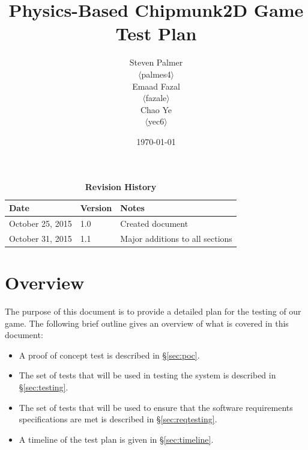 \documentclass[12pt, titlepage]{article}
\begin{document}
\title{\bf Physics-Based Chipmunk2D Game\\[\baselineskip]\Large Test Plan}
\author{Steven Palmer\\$\langle$palmes4$\rangle$\\Emaad Fazal\\$\langle$fazale$\rangle$\\Chao Ye\\$\langle$yec6$\rangle$}
\date{\today}
	
\maketitle

\tableofcontents
\listoftables
\listoffigures


\begin{table}[bp]
\caption*{\bf Revision History}
\begin{tabularx}{\textwidth}{p{3.5cm}p{2cm}X}
\toprule {\bf Date} & {\bf Version} & {\bf Notes}\\
\midrule
October 25, 2015 & 1.0 & Created document\\
October 31, 2015 & 1.1 & Major additions to all sections\\
\bottomrule
\end{tabularx}
\end{table}

\newpage


\section{Overview}
The purpose of this document is to provide a detailed plan for the testing of our game.  The following brief outline gives an overview of what is covered in this document:

\begin{itemize}
  \item A proof of concept test is described in \hyperref[sec:poc]{\S\ref*{sec:poc}}.
  \item The set of tests that will be used in testing the system is described in \hyperref[sec:testing]{\S\ref*{sec:testing}}.
  \item The set of tests that will be used to ensure that the software requirements specifications are met is described in \hyperref[sec:reqtesting]{\S\ref*{sec:reqtesting}}.
  \item A timeline of the test plan is given in \hyperref[sec:timeline]{\S\ref*{sec:timeline}}.
\end{itemize}
\end{document}
